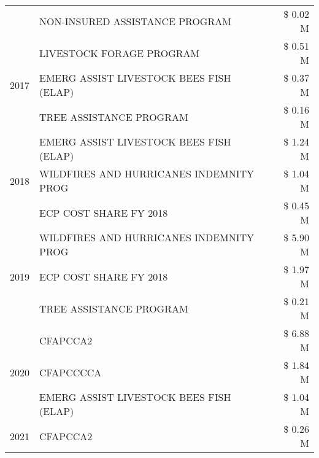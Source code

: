 \begin{tabular}{llr}
 & NON-INSURED ASSISTANCE PROGRAM                & \$ 0.02 M \\
\cline{1-3}
\multirow[t]{3}{*}{2017} & LIVESTOCK FORAGE PROGRAM & \$ 0.51 M \\
 & EMERG ASSIST LIVESTOCK BEES FISH (ELAP) & \$ 0.37 M \\
 & TREE ASSISTANCE PROGRAM & \$ 0.16 M \\
\cline{1-3}
\multirow[t]{3}{*}{2018} & EMERG ASSIST LIVESTOCK BEES FISH (ELAP) & \$ 1.24 M \\
 & WILDFIRES AND HURRICANES INDEMNITY PROG & \$ 1.04 M \\
 & ECP COST SHARE FY 2018 & \$ 0.45 M \\
\cline{1-3}
\multirow[t]{3}{*}{2019} & WILDFIRES AND HURRICANES INDEMNITY PROG & \$ 5.90 M \\
 & ECP COST SHARE FY 2018 & \$ 1.97 M \\
 & TREE ASSISTANCE PROGRAM & \$ 0.21 M \\
\cline{1-3}
\multirow[t]{3}{*}{2020} & CFAPCCA2 & \$ 6.88 M \\
 & CFAPCCCCA & \$ 1.84 M \\
 & EMERG ASSIST LIVESTOCK BEES FISH (ELAP) & \$ 1.04 M \\
\cline{1-3}
2021 & CFAPCCA2 & \$ 0.26 M \\
\cline{1-3}
\bottomrule
\end{tabular}
